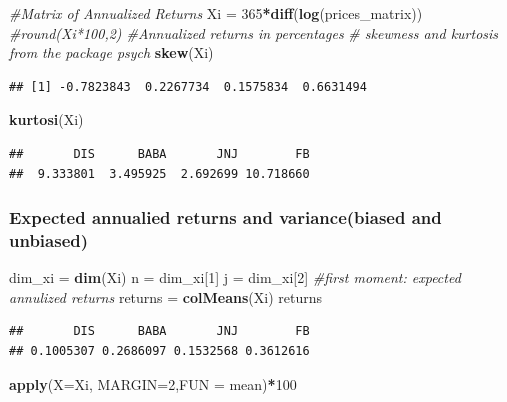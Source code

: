 \documentclass[]{article}
\newenvironment{Shaded}{\begin{snugshade}}{\end{snugshade}}
\newcommand{\KeywordTok}[1]{\textcolor[rgb]{0.13,0.29,0.53}{\textbf{#1}}}
\newcommand{\DataTypeTok}[1]{\textcolor[rgb]{0.13,0.29,0.53}{#1}}
\newcommand{\DecValTok}[1]{\textcolor[rgb]{0.00,0.00,0.81}{#1}}
\newcommand{\StringTok}[1]{\textcolor[rgb]{0.31,0.60,0.02}{#1}}
\newcommand{\CommentTok}[1]{\textcolor[rgb]{0.56,0.35,0.01}{\textit{#1}}}
\newcommand{\OperatorTok}[1]{\textcolor[rgb]{0.81,0.36,0.00}{\textbf{#1}}}
\newcommand{\NormalTok}[1]{#1}
\begin{document}
\begin{Shaded}
\begin{Highlighting}[]
\CommentTok{#Matrix of Annualized Returns}
\NormalTok{Xi =}\StringTok{ }\DecValTok{365}\OperatorTok{*}\KeywordTok{diff}\NormalTok{(}\KeywordTok{log}\NormalTok{(prices_matrix))}
\CommentTok{#round(Xi*100,2) #Annualized returns in percentages}
\CommentTok{# skewness and kurtosis from the package psych}
\KeywordTok{skew}\NormalTok{(Xi)}
\end{Highlighting}
\end{Shaded}

\begin{verbatim}
## [1] -0.7823843  0.2267734  0.1575834  0.6631494
\end{verbatim}

\begin{Shaded}
\begin{Highlighting}[]
\KeywordTok{kurtosi}\NormalTok{(Xi)}
\end{Highlighting}
\end{Shaded}

\begin{verbatim}
##       DIS      BABA       JNJ        FB 
##  9.333801  3.495925  2.692699 10.718660
\end{verbatim}

\subsubsection{Expected annualied returns and variance(biased and
unbiased)}\label{expected-annualied-returns-and-variancebiased-and-unbiased}

\begin{Shaded}
\begin{Highlighting}[]
\NormalTok{dim_xi =}\StringTok{ }\KeywordTok{dim}\NormalTok{(Xi)}
\NormalTok{n =}\StringTok{ }\NormalTok{dim_xi[}\DecValTok{1}\NormalTok{]}
\NormalTok{j =}\StringTok{ }\NormalTok{dim_xi[}\DecValTok{2}\NormalTok{]}
\CommentTok{#first moment: expected annulized returns }
\NormalTok{returns =}\StringTok{ }\KeywordTok{colMeans}\NormalTok{(Xi)}
\NormalTok{returns}
\end{Highlighting}
\end{Shaded}

\begin{verbatim}
##       DIS      BABA       JNJ        FB 
## 0.1005307 0.2686097 0.1532568 0.3612616
\end{verbatim}

\begin{Shaded}
\begin{Highlighting}[]
\KeywordTok{apply}\NormalTok{(}\DataTypeTok{X=}\NormalTok{Xi, }\DataTypeTok{MARGIN=}\DecValTok{2}\NormalTok{,}\DataTypeTok{FUN =}\NormalTok{ mean)}\OperatorTok{*}\DecValTok{100}
\end{Highlighting}
\end{Shaded}
\end{document}
